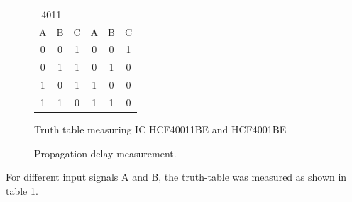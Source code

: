 \documentclass[journal]{IEEEtran}
\begin{document}
\begin{figure}
	\centering
	\begin{tabular}{c c | c || c c | c}
 		 \multicolumn{2}{c}{4011}
  		 \multicolumn{5}{c}{4001} \\
		  A & B & C & A & B & C \\ \hline
		  0 & 0 & 1 & 0 & 0 & 1 \\
		  0 & 1 & 1 & 0 & 1 & 0 \\
		  1 & 0 & 1 & 1 & 0 & 0 \\
		  1 & 1 & 0 & 1 & 1 & 0 \\
	\end{tabular}
	\caption{Truth table measuring IC HCF40011BE and HCF4001BE}
	\label{tab:truthtable} 
\end{figure}

 \begin{figure}
   \centering
  \caption{Propagation delay measurement.}
  \label{fig:propdelay}
\end{figure}

For different input signals A and B, the truth-table was measured as
shown in table \ref{tab:truthtable}.
\end{document}
